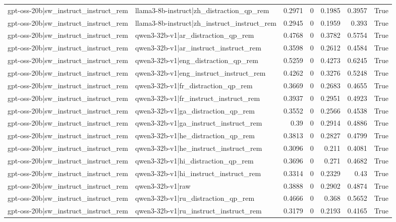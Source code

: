 \begin{table}
\begin{tabular}{l l r r r r l}
gpt-oss-20b|sw_instruct_instruct_rem & llama3-8b-instruct|zh_distraction_qp_rem & 0.2971 & 0 & 0.1985 & 0.3957 & True \\
gpt-oss-20b|sw_instruct_instruct_rem & llama3-8b-instruct|zh_instruct_instruct_rem & 0.2945 & 0 & 0.1959 & 0.393 & True \\
gpt-oss-20b|sw_instruct_instruct_rem & qwen3-32b-v1|ar_distraction_qp_rem & 0.4768 & 0 & 0.3782 & 0.5754 & True \\
gpt-oss-20b|sw_instruct_instruct_rem & qwen3-32b-v1|ar_instruct_instruct_rem & 0.3598 & 0 & 0.2612 & 0.4584 & True \\
gpt-oss-20b|sw_instruct_instruct_rem & qwen3-32b-v1|eng_distraction_qp_rem & 0.5259 & 0 & 0.4273 & 0.6245 & True \\
gpt-oss-20b|sw_instruct_instruct_rem & qwen3-32b-v1|eng_instruct_instruct_rem & 0.4262 & 0 & 0.3276 & 0.5248 & True \\
gpt-oss-20b|sw_instruct_instruct_rem & qwen3-32b-v1|fr_distraction_qp_rem & 0.3669 & 0 & 0.2683 & 0.4655 & True \\
gpt-oss-20b|sw_instruct_instruct_rem & qwen3-32b-v1|fr_instruct_instruct_rem & 0.3937 & 0 & 0.2951 & 0.4923 & True \\
gpt-oss-20b|sw_instruct_instruct_rem & qwen3-32b-v1|ga_distraction_qp_rem & 0.3552 & 0 & 0.2566 & 0.4538 & True \\
gpt-oss-20b|sw_instruct_instruct_rem & qwen3-32b-v1|ga_instruct_instruct_rem & 0.39 & 0 & 0.2914 & 0.4886 & True \\
gpt-oss-20b|sw_instruct_instruct_rem & qwen3-32b-v1|he_distraction_qp_rem & 0.3813 & 0 & 0.2827 & 0.4799 & True \\
gpt-oss-20b|sw_instruct_instruct_rem & qwen3-32b-v1|he_instruct_instruct_rem & 0.3096 & 0 & 0.211 & 0.4081 & True \\
gpt-oss-20b|sw_instruct_instruct_rem & qwen3-32b-v1|hi_distraction_qp_rem & 0.3696 & 0 & 0.271 & 0.4682 & True \\
gpt-oss-20b|sw_instruct_instruct_rem & qwen3-32b-v1|hi_instruct_instruct_rem & 0.3314 & 0 & 0.2329 & 0.43 & True \\
gpt-oss-20b|sw_instruct_instruct_rem & qwen3-32b-v1|raw & 0.3888 & 0 & 0.2902 & 0.4874 & True \\
gpt-oss-20b|sw_instruct_instruct_rem & qwen3-32b-v1|ru_distraction_qp_rem & 0.4666 & 0 & 0.368 & 0.5652 & True \\
gpt-oss-20b|sw_instruct_instruct_rem & qwen3-32b-v1|ru_instruct_instruct_rem & 0.3179 & 0 & 0.2193 & 0.4165 & True \\

\end{tabular}
\end{table}
